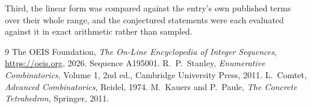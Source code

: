 \documentclass[11pt,a4paper]{article}
\theoremstyle{plain}
\theoremstyle{definition}
\begin{document}
Third, the linear form was compared against the entry's own published terms over their whole
range, and the conjectured statements were each evaluated against it in exact arithmetic
rather than sampled.

\begin{thebibliography}{9}
 The OEIS Foundation, \emph{The On-Line Encyclopedia of Integer
Sequences}, \url{https://oeis.org}, 2026. Sequence A195001.
 R.~P.~Stanley, \emph{Enumerative Combinatorics}, Volume 1, 2nd ed.,
Cambridge University Press, 2011.
 L.~Comtet, \emph{Advanced Combinatorics}, Reidel, 1974.
 M.~Kauers and P.~Paule, \emph{The Concrete Tetrahedron}, Springer, 2011.
\end{thebibliography}
\end{document}
